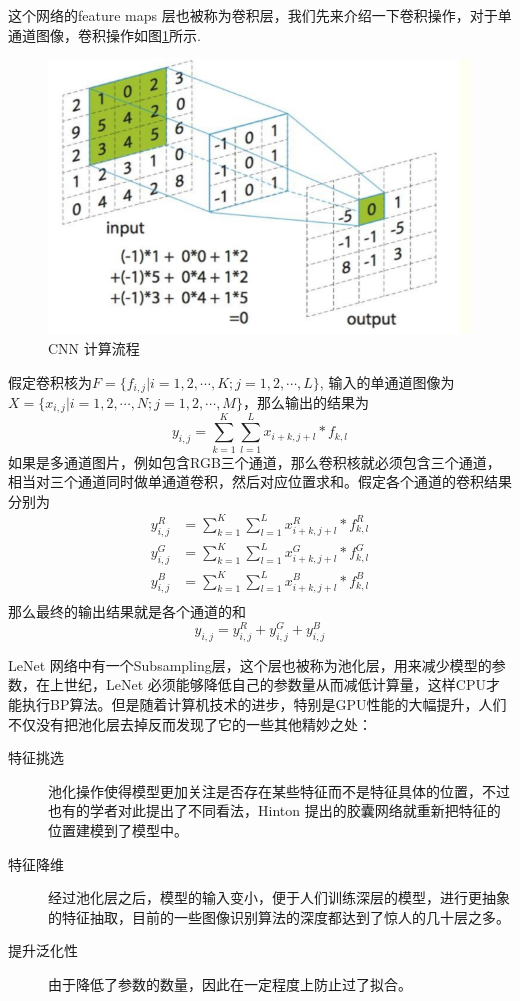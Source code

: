 \documentclass[twoside,a4paper,12pt]{book}%
\begin{document}
这个网络的feature maps 层也被称为卷积层，我们先来介绍一下卷积操作，对于单通道图像，卷积操作如图\ref{fig:cnn}所示.
\begin{figure}[htbp]
\begin{center}
\includegraphics[width=5.5in]{figures/cnn.png} 
\caption{CNN 计算流程}\label{fig:cnn}
\end{center}
\end{figure}
假定卷积核为$F=\{f_{i,j}|i=1,2,\cdots,K;j=1,2,\cdots,L\}$, 输入的单通道图像为$X=\{x_{i,j}|i=1,2,\cdots,N;j=1,2,\cdots,M\}$，那么输出的结果为
$$
y_{i,j} =\sum_{k=1}^{K}\sum_{l=1}^{L}x_{i+k,j+l}*f_{k,l} 
$$
如果是多通道图片，例如包含RGB三个通道，那么卷积核就必须包含三个通道，相当对三个通道同时做单通道卷积，然后对应位置求和。假定各个通道的卷积结果分别为
$$
\begin{aligned}
y^{R}_{i,j} &=\sum_{k=1}^{K}\sum_{l=1}^{L}x^{R}_{i+k,j+l}*f^{R}_{k,l}\\
y^{G}_{i,j} &=\sum_{k=1}^{K}\sum_{l=1}^{L}x^{G}_{i+k,j+l}*f^{G}_{k,l}\\
y^{B}_{i,j} &=\sum_{k=1}^{K}\sum_{l=1}^{L}x^{B}_{i+k,j+l}*f^{B}_{k,l} \\
\end{aligned}
$$
那么最终的输出结果就是各个通道的和
$$
y_{i,j}=y^{R}_{i,j} + y^{G}_{i,j} + y^{B}_{i,j}
$$

LeNet 网络中有一个Subsampling层，这个层也被称为池化层，用来减少模型的参数，在上世纪，LeNet 必须能够降低自己的参数量从而减低计算量，这样CPU才能执行BP算法。但是随着计算机技术的进步，特别是GPU性能的大幅提升，人们不仅没有把池化层去掉反而发现了它的一些其他精妙之处：
\begin{description}
\item [特征挑选]池化操作使得模型更加关注是否存在某些特征而不是特征具体的位置，不过也有的学者对此提出了不同看法，Hinton 提出的胶囊网络就重新把特征的位置建模到了模型中。
\item [特征降维]经过池化层之后，模型的输入变小，便于人们训练深层的模型，进行更抽象的特征抽取，目前的一些图像识别算法的深度都达到了惊人的几十层之多。
\item [提升泛化性]由于降低了参数的数量，因此在一定程度上防止过了拟合。
\end{description}
\end{document}
